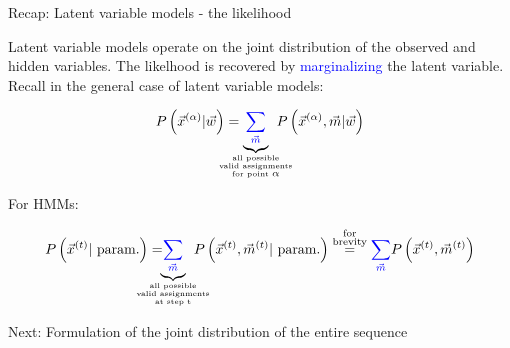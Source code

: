 \begin{frame}{Recap: Latent variable models - the likelihood}

Latent variable models operate on the joint distribution of the observed and hidden variables.
The likelhood is recovered by \textcolor{blue}{marginalizing} the latent variable.
Recall in the general case of latent variable models:

\begin{equation}
P \left( \vec{x}^{(\alpha)} | \vec{w} \right) =
\kern-4ex
\underbrace{{\color{blue}\sum_{\vec{m}}}}_{
\substack{
\text{\tiny all possible}\\
\text{\tiny valid assignments}\\
\text{\tiny for point }\alpha}} 
\kern-3ex
P \left( \vec{x}^{(\alpha)}, \vec{m} | \vec{w} \right)
\end{equation}

\pause

\svspace{-5mm}

For HMMs:

\svspace{-5mm}

\begin{equation}
P \left( \vec{x}^{(t)} |~\text{param.} \right) =
\kern-5ex
\underbrace{{\color{blue}\sum_{\vec{m}}}}_{
\substack{
\text{\tiny all possible}\\
\text{\tiny valid assignments}\\
\text{\tiny at step t}
}
}
\kern-3ex
P \left( \vec{x}^{(t)}, \vec{m}^{(t)} |~\text{param.} \right)
\stackrel{\substack{\text{for}\\
\text{brevity}}}{=}
{\color{blue}\sum_{\vec{m}}}
P \left( \vec{x}^{(t)}, \vec{m}^{(t)} \right)
\end{equation}

\pause

Next: Formulation of the joint distribution of the entire sequence

\pause



\end{frame}

